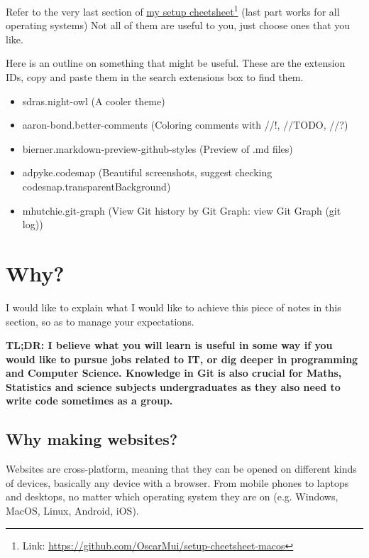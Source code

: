 Refer to the very last section of \href{https://github.com/OscarMui/setup-cheetsheet-macos}{my setup cheetsheet}\footnote{Link: \url{https://github.com/OscarMui/setup-cheetsheet-macos}} (last part works for all operating systems) Not all of them are useful to you, just choose ones that you like.

Here is an outline on something that might be useful. These are the extension IDs, copy and paste them in the search extensions box to find them.

\begin{itemize}
    \item sdras.night-owl (A cooler theme)
    \item aaron-bond.better-comments (Coloring comments with //!, //TODO, //?)
    \item bierner.markdown-preview-github-styles (Preview of .md files) 
    \item adpyke.codesnap (Beautiful screenshots, suggest checking codesnap.transparentBackground)
    \item mhutchie.git-graph (View Git history by Git Graph: view Git Graph (git log))
\end{itemize}

\section{Why?}
\label{sec:rationale}

I would like to explain what I would like to achieve this piece of notes in this section, so as to manage your expectations.
\vspace{6mm}

\textbf{TL;DR: I believe what you will learn is useful in some way if you would like to pursue jobs related to IT, or dig deeper in programming and Computer Science. Knowledge in Git is also crucial for Maths, Statistics and science subjects undergraduates as they also need to write code sometimes as a group.}

\subsection*{Why making websites?}

Websites are cross-platform, meaning that they can be opened on different kinds of devices, basically any device with a browser. From mobile phones to laptops and desktops, no matter which operating system they are on (e.g. Windows, MacOS, Linux, Android, iOS).

